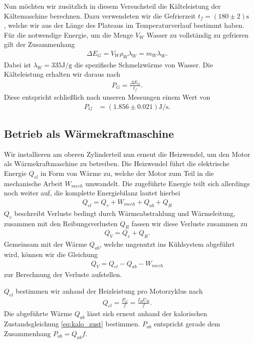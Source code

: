 Nun möchten wir zusätzlich in diesem Versuchsteil die Kälteleistung der Kältemaschine berechnen. Dazu verwendeten wir die Gefrierzeit $t_f = (180 \pm 2)\si{\second}$, welche wir aus der Länge des Plateaus im Temperaturverlauf bestimmt haben. Für die notwendige Energie, um die Menge $V_W$ Wasser zu vollständig zu gefrieren gilt der Zusammenhang
\begin{align}
    \Delta E_G = V_W \rho_W \lambda_W = m_W \lambda_W.
\end{align}
Dabei ist $\lambda_W = 335\si{\joule\per\gram}$ die spezifische Schmelzwärme von Wasser. Die Kälteleistung erhalten wir daraus nach
\begin{align}
    P_G = \frac{\Delta E_G}{t_f}.
\end{align}
Diese entspricht schließlich nach unseren Messungen einem Wert von
\begin{align}
    P_G &= (1.856 \pm 0.021)\si{\joule\per\second}.
\end{align}

\subsection{Betrieb als Wärmekraftmaschine}

Wir installieren am oberen Zylinderteil nun erneut die Heizwendel, um den Motor als Wärmekraftmaschine zu betreiben. Die Heizwendel führt die elektrische Energie $Q_{el}$ in Form von Wärme zu, welche der Motor zum Teil in die mechanische Arbeit $W_{mech}$ umwandelt. Die zugeführte Energie teilt sich allerdings noch weiter auf, die komplette Energiebilanz lautet hierbei
\begin{align}
    Q_{el} = Q_v + W_{mech} + Q_{ab} + Q_R
\end{align}
$Q_v$ beschreibt Verluste bedingt durch Wärmeabstrahlung und Wärmeleitung, zusammen mit den Reibungsverlusten $Q_R$ fassen wir diese Verluste zusammen zu
\begin{align}
    Q_{V} = Q_v + Q_R.
\end{align}
Gemeinsam mit der Wärme $Q_{ab}$, welche ungenutzt ins Kühlsystem abgeführt wird, können wir die Gleichung
\begin{align}
    Q_{V} = Q_{el} - Q_{ab} - W_{mech} \label{eq:Q_V}
\end{align}
zur Berechnung der Verluste aufstellen.

$Q_{el}$ bestimmen wir anhand der Heizleistung pro Motorzyklus nach
\begin{align}
    Q_{el} = \frac{P_{el}}{f} = \frac{I_H U_H}{f}.
\end{align}
Die abgeführte Wärme $Q_{ab}$ lässt sich erneut anhand der kalorischen Zustandsgleichung \eqref{eq:kalo_zust} bestimmen. $P_{ab}$ entspricht gerade dem Zusammenhang $P_{ab} = Q_{ab} f$.

